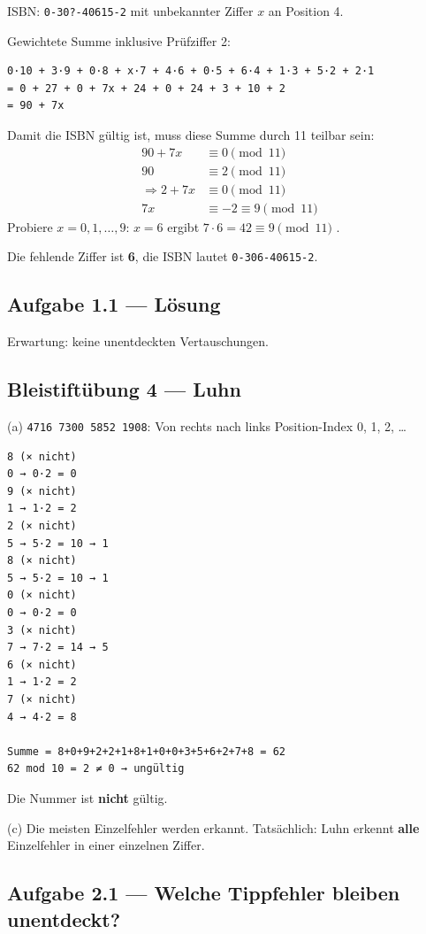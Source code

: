 ISBN: \texttt{0-30?-40615-2} mit unbekannter Ziffer $x$ an Position 4.

Gewichtete Summe inklusive Prüfziffer 2:
\begin{verbatim}
0·10 + 3·9 + 0·8 + x·7 + 4·6 + 0·5 + 6·4 + 1·3 + 5·2 + 2·1
= 0 + 27 + 0 + 7x + 24 + 0 + 24 + 3 + 10 + 2
= 90 + 7x
\end{verbatim}
Damit die ISBN gültig ist, muss diese Summe durch 11 teilbar sein:
\begin{align*}
  90 + 7x &\equiv 0 \pmod{11} \\
  90 &\equiv 2 \pmod{11} \\
  \Rightarrow 2 + 7x &\equiv 0 \pmod{11} \\
  7x &\equiv -2 \equiv 9 \pmod{11}
\end{align*}
Probiere $x = 0, 1, \dots, 9$: $x = 6$ ergibt $7 \cdot 6 = 42 \equiv 9
\pmod{11}$ \checkmark.

Die fehlende Ziffer ist \textbf{6}, die ISBN lautet
\texttt{0-306-40615-2}.

\subsection*{Aufgabe 1.1 — Lösung}


Erwartung: keine unentdeckten Vertauschungen.

\subsection*{Bleistiftübung 4 — Luhn}

(a) \texttt{4716 7300 5852 1908}:
Von rechts nach links Position-Index 0, 1, 2, …
\begin{verbatim}
8 (× nicht)
0 → 0·2 = 0
9 (× nicht)
1 → 1·2 = 2
2 (× nicht)
5 → 5·2 = 10 → 1
8 (× nicht)
5 → 5·2 = 10 → 1
0 (× nicht)
0 → 0·2 = 0
3 (× nicht)
7 → 7·2 = 14 → 5
6 (× nicht)
1 → 1·2 = 2
7 (× nicht)
4 → 4·2 = 8

Summe = 8+0+9+2+2+1+8+1+0+0+3+5+6+2+7+8 = 62
62 mod 10 = 2 ≠ 0 → ungültig
\end{verbatim}
Die Nummer ist \textbf{nicht} gültig.

(c) Die meisten Einzelfehler werden erkannt. Tatsächlich: Luhn erkennt
\textbf{alle} Einzelfehler in einer einzelnen Ziffer.

\subsection*{Aufgabe 2.1 — Welche Tippfehler bleiben unentdeckt?}

